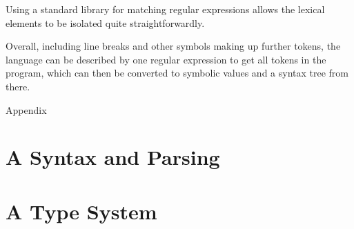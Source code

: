 \documentclass{article}
\begin{document}
    Using a standard library for matching regular expressions allows the lexical elements to be isolated quite straightforwardly.

    Overall, including line breaks and other symbols making up further tokens, the language can be described by one regular expression to get all tokens in the program, which can then be converted to symbolic values and a syntax tree from there.

    Appendix 

\section{A Syntax and Parsing}

\section{A Type System} \label{sec:typing}
\end{document}
